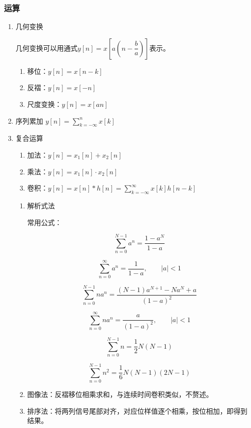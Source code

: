 \documentclass[UTF8,fontset=fandol,zihao=5]{ctexart}
\begin{document}
\subsubsection{运算}

\begin{enumerate}

  \item 几何变换
    
  几何变换可以用通式$\displaystyle y[n]=x\left [ a\left ( n - \dfrac{b}{a} \right ) \right ]$表示。
    
    \begin{enumerate}[label=(\arabic*)]
      \item 移位：$y[n]=x[n-k]$
      \item 反褶：$y[n]=x[-n]$
      \item 尺度变换：$y[n]=x[an]$
    \end{enumerate}

  \item 序列累加 $\displaystyle y[n]=\sum_{k=-\infty}^{n} x[k]$
  
  \item 复合运算
    \begin{enumerate}[label=(\arabic*)]
      \item 加法：$y[n]=x_1[n] + x_2[n]$
      \item 乘法：$y[n]=x_1[n] \cdot x_2[n]$
      \item 卷积：$y[n]=x[n] * h[n] = \displaystyle \sum_{k=-\infty}^{\infty} x[k] h[n-k]$
    \end{enumerate}
  
  \begin{methodbox}[【技巧】卷积计算]
    \begin{enumerate}[label=\arabic*.]
      \item 解析式法
      
      常用公式：
      
      \[
      \sum_{n=0}^{N-1} a^n = \frac{1-a^N}{1-a}
      \]

      \[
      \sum_{n=0}^{\infty} a^n = \frac{1}{1-a}, \qquad |a|<1
      \]

      \[
      \sum_{n=0}^{N-1} n a^n = \frac{(N-1)a^{N+1}-Na^N+a}{(1-a)^2}
      \]

      \[
      \sum_{n=0}^{\infty} n a^n = \frac{a}{(1-a)^2}, \qquad |a|<1
      \]

      \[
      \sum_{n=0}^{N-1} n = \frac{1}{2}N(N-1)
      \]

      \[
      \sum_{n=0}^{N-1} n^2 = \frac{1}{6}N(N-1)(2N-1)
      \]

      \item 图像法：反褶移位相乘求和，与连续时间卷积类似，不赘述。

      \item 排序法：将两列信号尾部对齐，对应位样值逐个相乘，按位相加，即得到结果。
    \end{enumerate}
  \end{methodbox}
  
\end{enumerate}
\end{document}
